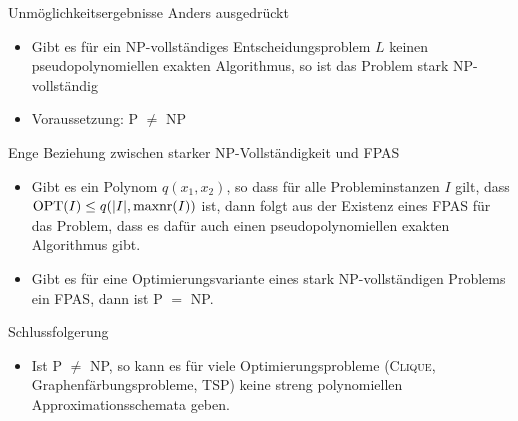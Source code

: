\begin{frame}{Unmöglichkeitsergebnisse}
	Anders ausgedrückt
	\begin{itemize}
		\item Gibt es für ein NP-vollständiges Entscheidungsproblem $L$ keinen pseudopolynomiellen exakten Algorithmus, so ist das Problem stark NP-vollständig
		\item Voraussetzung: P $\neq$ NP\newline
	\end{itemize}
	\pause

	Enge Beziehung zwischen starker NP-Vollständigkeit und FPAS
	\begin{itemize}
		\item Gibt es ein Polynom $q(x_1,x_2)$, so dass für alle Probleminstanzen $I$ gilt, dass $\operatorname{OPT}(I) \le q(\vert I \vert, \operatorname{maxnr}(I))$ ist, dann folgt aus der Existenz eines FPAS für das Problem, dass es dafür auch einen pseudopolynomiellen exakten Algorithmus gibt.
		\item Gibt es für eine Optimierungsvariante eines stark NP-vollständigen Problems ein FPAS, dann ist P $=$ NP.
	\end{itemize}
\end{frame}
\begin{frame}
	Schlussfolgerung
	\begin{itemize}
		\item Ist P $\neq$ NP, so kann es für viele Optimierungsprobleme (\textsc{Clique}, Graphenfärbungsprobleme, TSP) keine streng polynomiellen Approximationsschemata geben. 
	\end{itemize}
	
\end{frame}